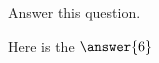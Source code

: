 \documentclass{ximera}
\author{}
\begin{document}
\begin{exercise}
  Answer this question.
  \begin{prompt}
    Here is the $\answer{6}$
  \end{prompt}
\end{exercise}
\end{document}

